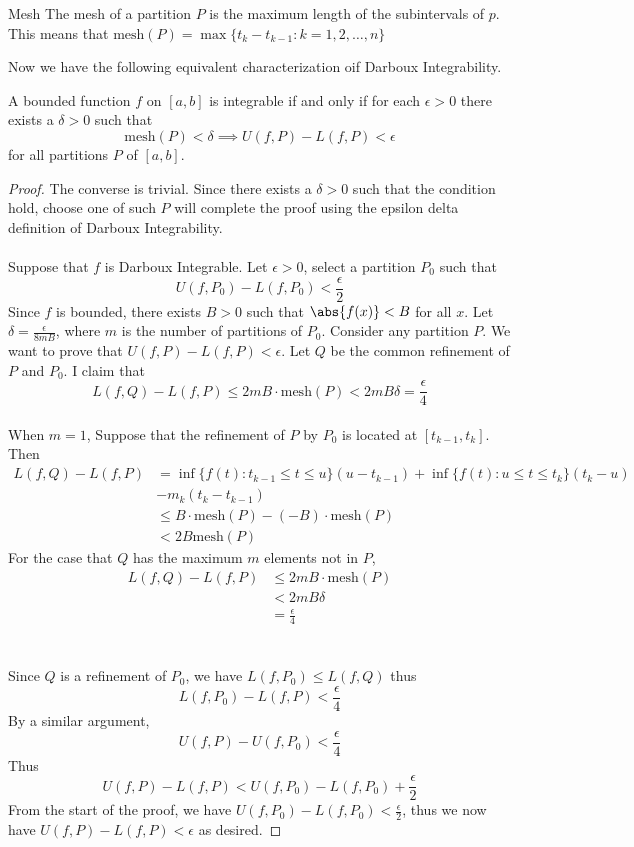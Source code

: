 \begin{defn}{Mesh}{} The mesh of a partition $P$ is the maximum length of the subintervals of $p$. This means that $\text{mesh}(P)=\max\{t_k-t_{k-1}:k=1,2,\dots,n\}$
\end{defn}

Now we have the following equivalent characterization oif Darboux Integrability. 

\begin{thm}{}{} A bounded function $f$ on $[a,b]$ is integrable if and only if for each $\epsilon>0$ there exists a $\delta>0$ such that $$\text{mesh}(P)<\delta\implies U(f,P)-L(f,P)<\epsilon$$ for all partitions $P$ of $[a,b]$. \tcbline
\begin{proof} The converse is trivial. Since there exists a $\delta>0$ such that the condition hold, choose one of such $P$ will complete the proof using the epsilon delta definition of Darboux Integrability. \\~\\
Suppose that $f$ is Darboux Integrable. Let $\epsilon>0$, select a partition $P_0$ such that $$U(f,P_0)-L(f,P_0)<\frac{\epsilon}{2}$$ Since $f$ is bounded, there exists $B>0$ such that $\abs{f(x)}<B$ for all $x$. Let $\delta
=\frac{\epsilon}{8mB}$, where $m$ is the number of partitions of $P_0$. Consider any partition $P$. We want to prove that $U(f,P)-L(f,P)<\epsilon$. Let $Q$ be the common refinement of $P$ and $P_0$. I claim that $$L(f,Q)-L(f,P)\leq 2mB\cdot\text{mesh}(P)<2mB\delta=\frac{\epsilon}{4}$$\\
When $m=1$, Suppose that the refinement of $P$ by $P_0$ is located at $[t_{k-1},t_k]$. Then 
\begin{align*}
L(f,Q)-L(f,P)&=\inf\{f(t):t_{k-1}\leq t\leq u\}(u-t_{k-1})+\inf\{f(t):u\leq t\leq t_k\}(t_k-u)\\
&-m_k(t_k-t_{k-1})\\
&\leq B\cdot\text{mesh}(P)-(-B)\cdot\text{mesh}(P)\tag{$-B$ is a minimum of $f(x)$}\\
&<2B\text{mesh}(P)
\end{align*}
For the case that $Q$ has the maximum $m$ elements not in $P$, 
\begin{align*}
L(f,Q)-L(f,P)&\leq 2mB\cdot\text{mesh}(P)\tag{Same argument as the case for $m=1$}\\
&<2mB\delta\\
&=\frac{\epsilon}{4}\tag{constructed $\delta$}
\end{align*}
\\~\\
Since $Q$ is a refinement of $P_0$, we have $L(f,P_0)\leq L(f,Q)$ thus $$L(f,P_0)-L(f,P)<\frac{\epsilon}{4}$$ By a similar argument, $$U(f,P)-U(f,P_0)<\frac{\epsilon}{4}$$
Thus $$U(f,P)-L(f,P)<U(f,P_0)-L(f,P_0)+\frac{\epsilon}{2}$$ From the start of the proof, we have $U(f,P_0)-L(f,P_0)<\frac{\epsilon}{2}$, thus we now have $U(f,P)-L(f,P)<\epsilon$ as desired. 
\end{proof}
\end{thm}


